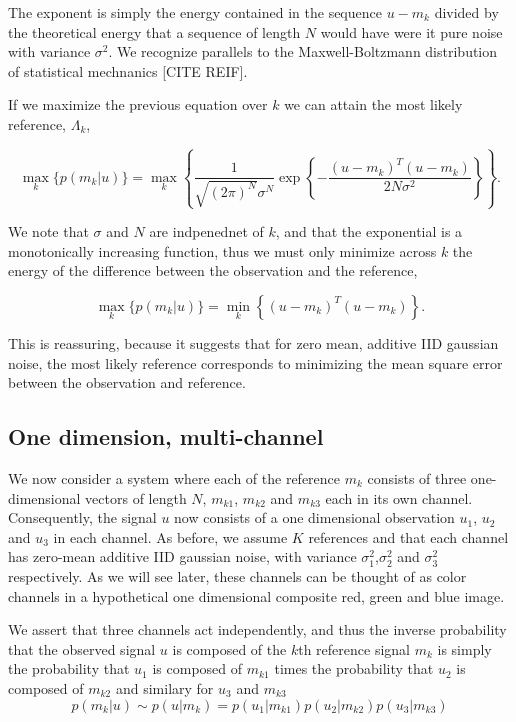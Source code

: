 The exponent is simply the energy contained in the sequence $u-m_k$ divided by the
theoretical energy that a sequence of length $N$ would have were it pure noise with variance $\sigma^2$. We recognize parallels to the Maxwell-Boltzmann distribution of statistical
mechnanics [CITE REIF].  


If we maximize the previous equation over $k$ we can attain the most likely reference, $\Lambda_k$,


\begin{equation}
\max_k   \big\{ p(m_k|u) \big\} =  \max_k  \left\{ \frac{1}{  \sqrt{ (2\pi)^N} \sigma^N  } \exp\left\{ -\frac{(u-m_k)^T(u-m_k)} {2 N \sigma^2 } \right\} \right\}. 
\end{equation}

We note that $\sigma$ and $N$ are indpenednet of $k$, and that the exponential is a monotonically increasing function, thus we must only minimize across $k$ the energy of the difference between the observation and the reference,

\begin{equation}
\max_k   \big\{ p(m_k|u) \big\} =  \min_k  \left\{ (u-m_k)^T(u-m_k) \right\}. 
\end{equation}

This is reassuring, because it suggests that for zero mean, additive IID gaussian noise, the most likely reference corresponds to minimizing the mean square error between the observation and reference. 

\subsection{One dimension, multi-channel}
We now consider a system where each of the reference $m_k$ consists of three one-dimensional vectors of length $N$, $m_{k1}$, $m_{k2}$ and $m_{k3}$ each in its own channel. Consequently, the signal $u$ now consists of a one dimensional observation $u_1$, $u_2$ and $u_3$ in each channel. As before, we assume $K$ references and that each channel has zero-mean additive IID gaussian noise, with variance $\sigma_1^2$,$\sigma_2^2$ and $\sigma_3^2$ respectively. As we will see later, these channels can be thought of as color channels in a hypothetical one dimensional composite red, green and blue image. 

We assert that three channels act independently, and thus the inverse probability that the observed signal $u$ is composed of the $k$th reference signal $m_k$ is simply the probability that $u_1$ is composed of $m_{k1}$ times the probability that $u_2$ is composed of $m_{k2}$ and similary for $u_3$ and $m_{k3}$
\begin{equation}
p(m_k|u)\sim p(u|m_k) = p(u_1|m_{k1})p(u_2|m_{k2})p(u_3|m_{k3})
\end{equation}

